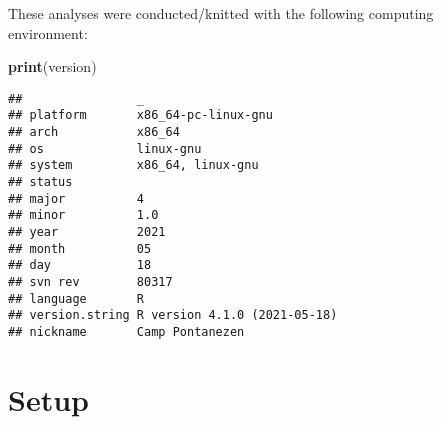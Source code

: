 \documentclass[]{book}
\newenvironment{Shaded}{\begin{snugshade}}{\end{snugshade}}
\newcommand{\KeywordTok}[1]{\textcolor[rgb]{0.13,0.29,0.53}{\textbf{#1}}}
\newcommand{\NormalTok}[1]{#1}
\begin{document}
These analyses were conducted/knitted with the following computing environment:

\begin{Shaded}
\begin{Highlighting}[]
\KeywordTok{print}\NormalTok{(version)}
\end{Highlighting}
\end{Shaded}

\begin{verbatim}
##                _                           
## platform       x86_64-pc-linux-gnu         
## arch           x86_64                      
## os             linux-gnu                   
## system         x86_64, linux-gnu           
## status                                     
## major          4                           
## minor          1.0                         
## year           2021                        
## month          05                          
## day            18                          
## svn rev        80317                       
## language       R                           
## version.string R version 4.1.0 (2021-05-18)
## nickname       Camp Pontanezen
\end{verbatim}

\hypertarget{setup-3}{%
\section{Setup}\label{setup-3}}
\end{document}
